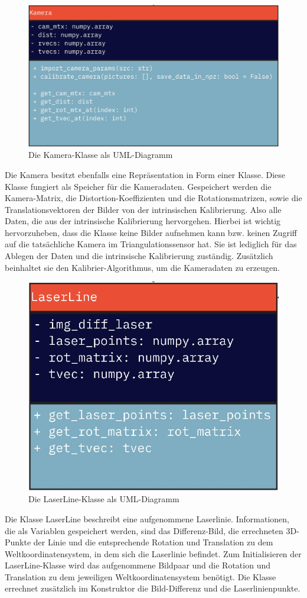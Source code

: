 		\begin{figure}[h]
			\centering
			\includegraphics[width=0.7\linewidth]{img/hauptteil/software/Kamera_UML.png}
			\caption{Die Kamera-Klasse als UML-Diagramm}
			\label{fig:kamera_uml}
		\end{figure}
		Die Kamera besitzt ebenfalls eine Repräsentation in Form einer Klasse. Diese Klasse fungiert als Speicher für die Kameradaten. Gespeichert werden die Kamera-Matrix, die Distortion-Koeffizienten und die Rotationsmatrizen, sowie die Translationsvektoren der Bilder von der intrinsischen Kalibrierung. Also alle Daten, die aus der intrinsische Kalibrierung hervorgehen. Hierbei ist wichtig hervorzuheben, dass die Klasse keine Bilder aufnehmen kann bzw. keinen Zugriff auf die tatsächliche Kamera im Triangulationssensor hat. Sie ist lediglich für das Ablegen der Daten und die intrinsische Kalibrierung zuständig. Zusätzlich beinhaltet sie den Kalibrier-Algorithmus, um die Kameradaten zu erzeugen.
		\begin{figure}[h]
			\centering
			\includegraphics[width=0.35\linewidth]{img/hauptteil/software/LaserLine_UML.png}
			\caption{Die LaserLine-Klasse als UML-Diagramm}
			\label{fig:laser_line_uml}
		\end{figure}
		Die Klasse LaserLine beschreibt eine aufgenommene Laserlinie. Informationen, die als Variablen gespeichert werden, sind das Differenz-Bild, die errechneten 3D-Punkte der Linie und die entsprechende Rotation und Translation zu dem Weltkoordinatensystem, in dem sich die Laserlinie befindet. Zum Initialisieren der LaserLine-Klasse wird das aufgenommene Bildpaar und die Rotation und Translation zu dem jeweiligen Weltkoordinatensystem benötigt. Die Klasse errechnet zusätzlich im Konstruktor die Bild-Differenz und die Laserlinienpunkte.
		
